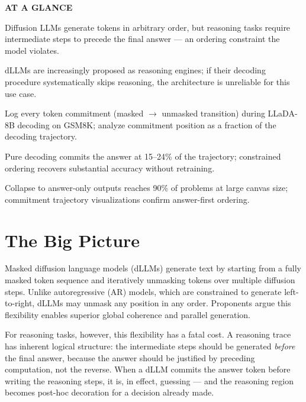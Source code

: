 \documentclass[10pt,twocolumn]{article}
\begin{document}
\begin{mdframed}[backgroundcolor=boxgray,linecolor=rulered,linewidth=1pt,
    innerleftmargin=6pt,innerrightmargin=6pt,
    innertopmargin=6pt,innerbottommargin=6pt]
\textbf{\small AT A GLANCE}\par\vspace{4pt}
\begin{description}[leftmargin=0pt,labelsep=4pt,itemsep=2pt,parsep=0pt,
    font=\small\bfseries]
  \item[Problem:] Diffusion LLMs generate tokens in arbitrary order, but reasoning tasks require
    intermediate steps to precede the final answer — an ordering constraint the model violates.
  \item[Why it matters:] dLLMs are increasingly proposed as reasoning engines; if their decoding
    procedure systematically skips reasoning, the architecture is unreliable for this use case.
  \item[Method:] Log every token commitment (masked $\to$ unmasked transition) during LLaDA-8B
    decoding on GSM8K; analyze commitment position as a fraction of the decoding trajectory.
  \item[Result:] Pure decoding commits the answer at 15--24\% of the trajectory; constrained
    ordering recovers substantial accuracy without retraining.
  \item[Evidence:] Collapse to answer-only outputs reaches 90\% of problems at large canvas size;
    commitment trajectory visualizations confirm answer-first ordering.
\end{description}
\end{mdframed}

\section{The Big Picture}

Masked diffusion language models (dLLMs) generate text by starting from a fully
masked token sequence and iteratively unmasking tokens over multiple diffusion steps.
Unlike autoregressive (AR) models, which are constrained to generate left-to-right,
dLLMs may unmask any position in any order. Proponents argue this flexibility enables
superior global coherence and parallel generation.

For reasoning tasks, however, this flexibility has a fatal cost. A reasoning trace
has inherent logical structure: the intermediate steps should be generated \emph{before}
the final answer, because the answer should be justified by preceding computation, not
the reverse. When a dLLM commits the answer token before writing the reasoning steps,
it is, in effect, guessing — and the reasoning region becomes post-hoc decoration for
a decision already made.
\end{document}
